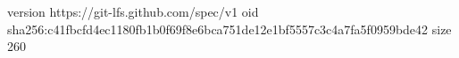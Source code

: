 version https://git-lfs.github.com/spec/v1
oid sha256:c41fbcfd4ec1180fb1b0f69f8e6bca751de12e1bf5557c3c4a7fa5f0959bde42
size 260
